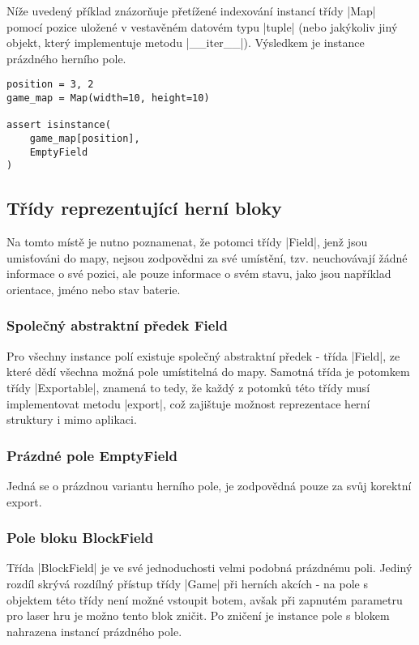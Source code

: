 Níže uvedený příklad znázorňuje přetížené indexování instancí třídy \ic|Map| pomocí pozice uložené v vestavěném datovém typu \ic|tuple| (nebo jakýkoliv jiný objekt, který implementuje metodu \ic|__iter__|). Výsledkem je instance prázdného herního pole.

\begin{lstlisting}[caption={Přetížené indexování třídy Map}]
position = 3, 2
game_map = Map(width=10, height=10)

assert isinstance(
	game_map[position],
	EmptyField
)
\end{lstlisting}

\subsection{Třídy reprezentující herní bloky}

Na tomto místě je nutno poznamenat, že potomci třídy \ic|Field|, jenž jsou umisťováni do mapy, nejsou zodpovědni za své umístění, tzv. neuchovávají žádné informace o své pozici, ale pouze informace o svém stavu, jako jsou například orientace, jméno nebo stav baterie. 

\subsubsection{Společný abstraktní předek Field}

\begin{sloppypar}
	Pro všechny instance polí existuje společný abstraktní předek - třída \ic|Field|, ze které dědí všechna možná pole umístitelná do mapy. Samotná třída je potomkem třídy \ic|Exportable|, znamená to tedy, že každý z potomků této třídy musí implementovat metodu \ic|export|, což zajištuje možnost reprezentace herní struktury i mimo aplikaci.
\end{sloppypar}

\subsubsection{Prázdné pole EmptyField}

Jedná se o prázdnou variantu herního pole, je zodpovědná pouze za svůj korektní export.

\subsubsection{Pole bloku BlockField}

Třída \ic|BlockField| je ve své jednoduchosti velmi podobná prázdnému poli. Jediný rozdíl skrývá rozdílný přístup třídy \ic|Game| při herních akcích - na pole s objektem této třídy není možné vstoupit botem, avšak při zapnutém parametru pro laser hru je možno tento blok zničit. Po zničení je instance pole s blokem nahrazena instancí prázdného pole.

